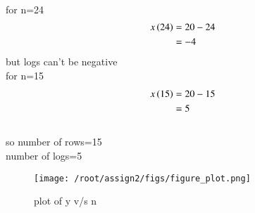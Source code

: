 \documentclass[journal,12pt,twocolumn]{IEEEtran}
\theoremstyle{remark}
\begin{document}
\\for n=24
\begin{align}
x\left(24\right)&=20-24
\\&={-4}
\end{align}
but logs can't be negative
\\for n=15
\begin{align}
x\left(15\right)&=20-15
\\&=5
\end{align}
\\so number of rows=15
\\number of logs=5
\\\begin{figure}[h]
  \renewcommand\thefigure{1}
    \centering
    \texttt{[image: /root/assign2/figs/figure\_plot.png]}
    \caption{plot of y v/s n}
    \label{fig:enter-label}
\end{figure}
\end{document}
